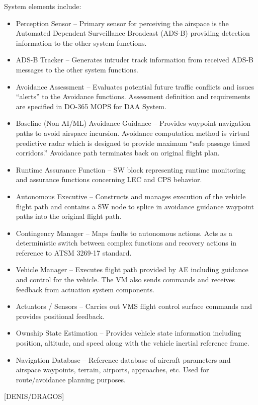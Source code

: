 System elements include: 
\begin{itemize}
\item Perception Sensor – Primary sensor for perceiving the airspace is the Automated Dependent Surveillance Broadcast (ADS-B) providing detection information to the other system functions.
\item ADS-B Tracker – Generates intruder track information from received ADS-B messages to the other system functions.
\item Avoidance Assessment – Evaluates potential future traffic conflicts and issues “alerts” to the Avoidance functions.  Assessment definition and requirements are specified in DO-365 MOPS for DAA System.
\item Baseline (Non AI/ML) Avoidance Guidance – Provides waypoint navigation paths to avoid airspace incursion.  Avoidance computation method is virtual predictive radar which is designed to provide maximum “safe passage timed corridors.”  Avoidance path terminates back on original flight plan.
\item Runtime Assurance Function – SW block representing runtime monitoring and assurance functions concerning LEC and CPS behavior.
\item Autonomous Executive – Constructs and manages execution of the vehicle flight path and contains a SW node to splice in avoidance guidance waypoint paths into the original flight path.
\item Contingency Manager – Maps faults to autonomous actions.  Acts as a deterministic switch between complex functions and recovery actions in reference to ATSM 3269-17 standard.
\item Vehicle Manager – Executes flight path provided by AE including guidance and control for the vehicle.  The VM also sends commands and receives feedback from actuation system components.
\item Actuators / Sensors – Carries out VMS flight control surface commands and provides positional feedback.
\item Ownship State Estimation – Provides vehicle state information including position, altitude, and speed along with the vehicle inertial reference frame.
\item Navigation Database – Reference database of aircraft parameters and airspace waypoints, terrain, airports, approaches, etc.  Used for route/avoidance planning purposes.
\end{itemize}

[DENIS/DRAGOS]

